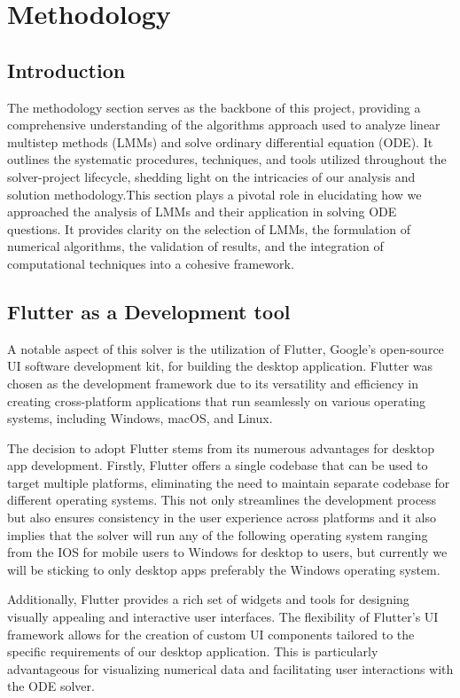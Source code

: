 \chapter{Methodology}

\section{Introduction}
The methodology section serves as the backbone of this project, providing a comprehensive understanding of the algorithms approach used to analyze linear multistep methods (LMMs) and solve ordinary differential equation (ODE). It outlines the systematic procedures, techniques, and tools utilized throughout the solver-project lifecycle, shedding light on the intricacies of our analysis and solution methodology.This section plays a pivotal role in elucidating how we approached the analysis of LMMs and their application in solving ODE questions. It provides clarity on the selection of LMMs, the formulation of numerical algorithms, the validation of results, and the integration of computational techniques into a cohesive framework.


\section{Flutter as a Development tool}
A notable aspect of this solver is the utilization of Flutter, Google's open-source UI software development kit, for building the desktop application. Flutter was chosen as the development framework due to its versatility and efficiency in creating cross-platform applications that run seamlessly on various operating systems, including Windows, macOS, and Linux.

The decision to adopt Flutter stems from its numerous advantages for desktop app development. Firstly, Flutter offers a single codebase that can be used to target multiple platforms, eliminating the need to maintain separate codebase for different operating systems. This not only streamlines the development process but also ensures consistency in the user experience across platforms and it also implies that the solver will run any of the following operating system ranging from the IOS for mobile users to Windows for desktop to users, but currently we will be sticking to only desktop apps preferably the Windows operating system.

Additionally, Flutter provides a rich set of widgets and tools for designing visually appealing and interactive user interfaces. The flexibility of Flutter's UI framework allows for the creation of custom UI components tailored to the specific requirements of our desktop application. This is particularly advantageous for visualizing numerical data and facilitating user interactions with the ODE solver.

